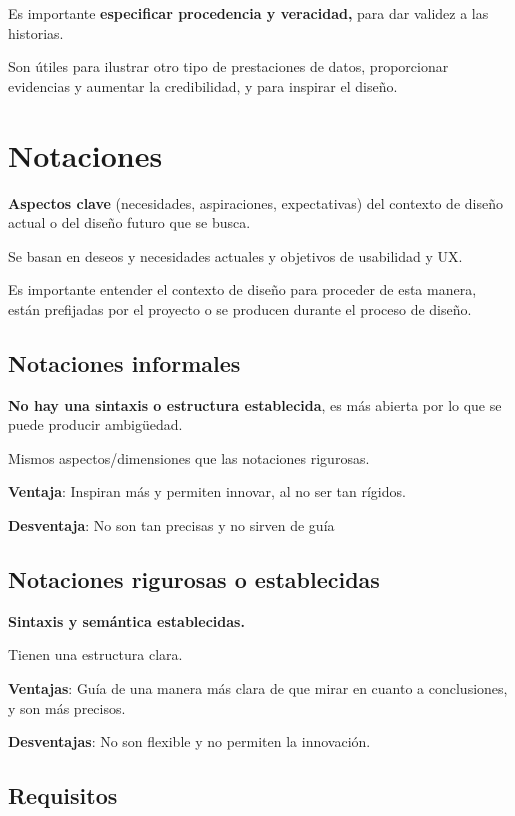 \documentclass[12pt, twoside, openright]{report} %
\begin{document}
Es importante \textbf{especificar procedencia y veracidad,} para dar
validez a las historias.

Son útiles para ilustrar otro tipo de prestaciones de datos,
proporcionar evidencias y aumentar la credibilidad, y para inspirar el
diseño.

\section{Notaciones}

\textbf{Aspectos clave} (necesidades, aspiraciones, expectativas) del
contexto de diseño actual o del diseño futuro que se busca.

Se basan en deseos y necesidades actuales y objetivos de usabilidad y
UX.

Es importante entender el contexto de diseño para proceder de esta
manera, están prefijadas por el proyecto o se producen durante el
proceso de diseño.

\subsection{Notaciones informales}

\textbf{No hay una sintaxis o estructura establecida}, es más abierta
por lo que se puede producir ambigüedad.

Mismos aspectos/dimensiones que las notaciones rigurosas.

\textbf{Ventaja}: Inspiran más y permiten innovar, al no ser tan
rígidos.

\textbf{Desventaja}: No son tan precisas y no sirven de guía

\subsection{Notaciones rigurosas o establecidas}

\textbf{Sintaxis y semántica establecidas.}

Tienen una estructura clara.

\textbf{Ventajas}: Guía de una manera más clara de que mirar en cuanto a
conclusiones, y son más precisos.

\textbf{Desventajas}: No son flexible y no permiten la innovación.

\subsection{Requisitos}
\end{document}
